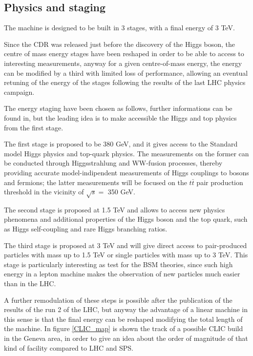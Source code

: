 \subsection{Physics and staging}

The machine is designed to be built in 3 stages, with a final energy of 3 TeV. 

Since the CDR\cite{CLIC:cdr} was released just before the discovery of the Higgs boson, the centre of mass energy stages have been reshaped in order to be able to access to interesting measurements, anyway for a given centre-of-mass energy, the energy can be modified by a third with limited loss of performance\cite{CLIC:cdrVol3}, allowing an eventual retuning of the energy of the stages following the results of the last LHC physics campaign.

The energy staging have been chosen as follows, further informations can be found in\cite{CLIC:staging2016,Bozovic-Jelisavcic:2160172}, but the leading idea is to make accessible the Higgs and top physics from the first stage.

The first stage is proposed to be 380 GeV, and it gives access to the Standard model Higgs physics and top-quark physics. The measurements on the former can be conducted through Higgsstrahlung and WW-fusion processes, thereby providing accurate model-indipendent measurements of Higgs couplings to bosons and fermions\cite{Roloff:2210491}; the latter measurements will be focused on the $t\bar{t}$ pair production threshold in the vicinity of $\sqrt{s} = $ 350 GeV.

The second stage is proposed at 1.5 TeV and allows to access new physics phenomena and additional properties of the Higgs boson and the top quark, such as Higgs self-coupling and rare Higgs branching ratios.

The third stage is proposed at 3 TeV and will give direct access to pair-produced particles with mass up to 1.5 TeV or single particles with mass up to 3 TeV. This stage is particularly interesting as test for the BSM theories, since such high energy in a lepton machine makes the observation of new particles much easier than in the LHC.

A further remodulation of these steps is possible after the publication of the results of the run 2 of the LHC, but anyway the advantage of a linear machine in this sense is that the final energy can be reshaped modifying the total length of the machine. In figure \ref{CLIC_map} is shown the track of a possible CLIC build in the Geneva area, in order to give an idea about the order of magnitude of that kind of facility compared to LHC and SPS.

